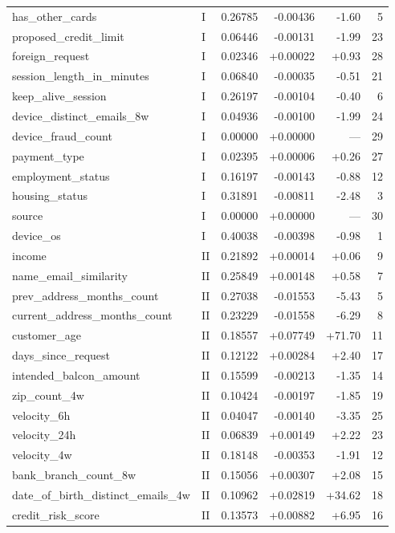 \begin{longtable}{@{}llrrrr@{}}
has\_other\_cards & I & 0.26785 & -0.00436 & -1.60 & 5 \\
proposed\_credit\_limit & I & 0.06446 & -0.00131 & -1.99 & 23 \\
foreign\_request & I & 0.02346 & +0.00022 & +0.93 & 28 \\
session\_length\_in\_minutes & I & 0.06840 & -0.00035 & -0.51 & 21 \\
keep\_alive\_session & I & 0.26197 & -0.00104 & -0.40 & 6 \\
device\_distinct\_emails\_8w & I & 0.04936 & -0.00100 & -1.99 & 24 \\
device\_fraud\_count & I & 0.00000 & +0.00000 & --- & 29 \\
payment\_type & I & 0.02395 & +0.00006 & +0.26 & 27 \\
employment\_status & I & 0.16197 & -0.00143 & -0.88 & 12 \\
housing\_status & I & 0.31891 & -0.00811 & -2.48 & 3 \\
source & I & 0.00000 & +0.00000 & --- & 30 \\
device\_os & I & 0.40038 & -0.00398 & -0.98 & 1 \\
income & II & 0.21892 & +0.00014 & +0.06 & 9 \\
name\_email\_similarity & II & 0.25849 & +0.00148 & +0.58 & 7 \\
prev\_address\_months\_count & II & 0.27038 & -0.01553 & -5.43 & 5 \\
current\_address\_months\_count & II & 0.23229 & -0.01558 & -6.29 & 8 \\
customer\_age & II & 0.18557 & +0.07749 & +71.70 & 11 \\
days\_since\_request & II & 0.12122 & +0.00284 & +2.40 & 17 \\
intended\_balcon\_amount & II & 0.15599 & -0.00213 & -1.35 & 14 \\
zip\_count\_4w & II & 0.10424 & -0.00197 & -1.85 & 19 \\
velocity\_6h & II & 0.04047 & -0.00140 & -3.35 & 25 \\
velocity\_24h & II & 0.06839 & +0.00149 & +2.22 & 23 \\
velocity\_4w & II & 0.18148 & -0.00353 & -1.91 & 12 \\
bank\_branch\_count\_8w & II & 0.15056 & +0.00307 & +2.08 & 15 \\
date\_of\_birth\_distinct\_emails\_4w & II & 0.10962 & +0.02819 & +34.62 & 18 \\
credit\_risk\_score & II & 0.13573 & +0.00882 & +6.95 & 16 \\

\end{longtable}
